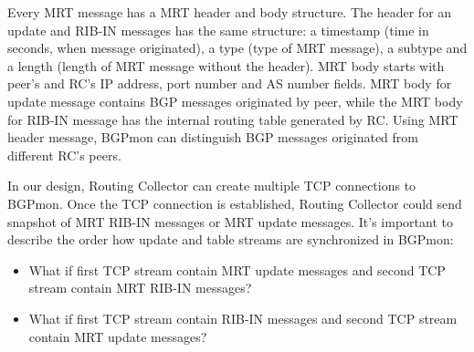 
Every MRT message has a MRT header and body structure. The header for an update and RIB-IN messages has the same structure: a timestamp (time in seconds, when message originated), a type (type of MRT message), a subtype and a length (length of MRT message without the header). MRT body starts with peer's and RC's IP address, port number and AS number fields.  MRT body for update message contains BGP messages originated by peer, while the MRT body for RIB-IN message has the internal routing table generated by RC. Using MRT header message, BGPmon can distinguish BGP messages originated from different RC's peers.




In our design, Routing Collector can create multiple TCP connections to BGPmon. Once the TCP connection is established, Routing Collector could send snapshot of MRT RIB-IN messages or MRT update messages. It's important to describe the order how update and table streams are synchronized in BGPmon:
\begin{itemize}
\item{What if first TCP stream contain MRT update messages and second TCP stream contain MRT RIB-IN messages?}
\item{What if first TCP stream contain RIB-IN messages and second TCP stream contain MRT update messages?} 
\end{itemize}

